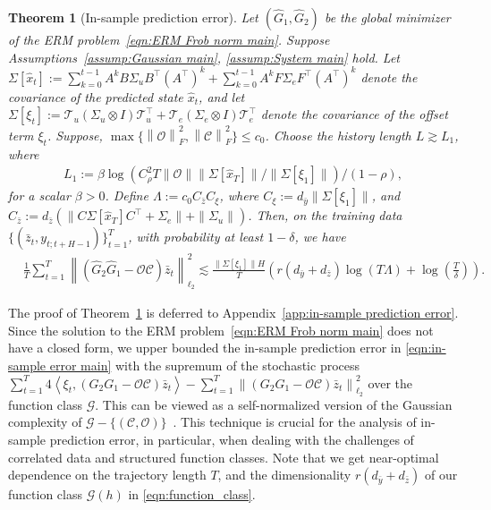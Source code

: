 \documentclass[11pt]{article}
\newtheorem{theorem}{Theorem}
\renewcommand{\cite}{\citep}
\newcommand{\ybar}{\bar{y}}
\newcommand{\zbar}{\bar{z}}
\newcommand{\xtil}{\hat{x}}
\newcommand{\Ccal}{\mathcal{C}}
\newcommand{\Gcal}{\mathcal{G}}
\newcommand{\Ocal}{\mathcal{O}}
\newcommand{\Tcal}{\mathcal{T}}
\newcommand{\tn}[1]{\left\|{#1}\right\|_{\ell_2}}
\newcommand{\tf}[1]{\left\|{#1}\right\|_{F}}
\newcommand{\norm}[1]{\|{#1} \|}
\newcommand{\T}{\top}
\newcommand{\li}{\left<}
\newcommand{\ri}{\right>}
\newcommand{\<}{\langle}
\renewcommand{\>}{\rangle}
\numberwithin{equation}{section}
\begin{document}
\begin{theorem}[In-sample prediction error]\label{thrm:function_estimation main}
     Let $(\hat{G}_1, \hat{G}_2)$ be the global minimizer of the ERM problem~\eqref{eqn:ERM Frob norm main}. 
     Suppose Assumptions~\ref{assump:Gaussian main},  \ref{assump:System main} hold. Let $\Sigma[\xtil_t] :=  \sum_{k=0}^{t-1} A^k B \Sigma_u B^\T (A^\T)^k + \sum_{k=0}^{t-1} A^k F \Sigma_e F^\T (A^\T)^k$ denote the covariance of the predicted state $\xtil_t$, and let $\Sigma[\xi_t]  := \Tcal_u(\Sigma_u \otimes I)\Tcal_u^\T + \Tcal_e(\Sigma_e \otimes I)\Tcal_e^\T$ denote the covariance of the offset term $\xi_t$. Suppose, $\max\{\tf{\Ocal}^2, \tf{\Ccal}^2\} \leq c_0$. Choose the history length $L \gtrsim L_1$, where
     \begin{align*}
         L_1 := \beta\log\left(C_\rho^2 T \norm{\Ocal}\norm{\Sigma[\xtil_T]}/\norm{\Sigma[\xi_1]}\right)/(1-\rho),
     \end{align*} 
     for a scalar $\beta >0$. Define $\Lambda := c_0 C_{\zbar} C_{\xi}$, where $C_{\xi}{:=}d_{\ybar}\norm{\Sigma[\xi_1]}$, and $C_{\zbar}{:=} d_{\zbar}(\norm{C\Sigma[\xtil_T]C^\T {+} \Sigma_e} {+} \norm{\Sigma_u}) $. Then, on the training data $\lbrace (\zbar_t, y_{t;t+H-1}) \rbrace_{t=1}^{T}$, with probability at least $1-\delta$, we have     
    \begin{align} %
        &\frac{1}{T}\sum_{t=1}^{T}\tn{\left(\hat{G}_2\hat{G}_1 - \Ocal \Ccal\right) \zbar_t}^2 \lesssim \frac{\norm{\Sigma[\xi_1]}H}{T}  \left( r \left(d_{\ybar} + d_{\zbar} \right)\log \left( T\Lambda \right) + \log \left(\frac{T}{\delta}\right) \right). \label{eqn:in-sample error main}
    \end{align}
\end{theorem}


The proof of Theorem~\ref{thrm:function_estimation main} is deferred to Appendix~\ref{app:in-sample prediction error}.
Since the solution to the ERM problem~\eqref{eqn:ERM Frob norm main} does not have a closed form, we upper bounded the in-sample prediction error in \eqref{eqn:in-sample error main} with the supremum of the stochastic process $\sum_{t=1}^{T} 4 \li  \xi_t, (G_2G_1 - \Ocal\Ccal) \zbar_t \ri - \sum_{t=1}^{T}\tn{ (G_2G_1 - \Ocal\Ccal)\zbar_t}^2$ over the function class $\Gcal$. This can be viewed as a self-normalized version of the Gaussian complexity of $\Gcal - \{(\Ccal,\Ocal)\}$~\cite{ziemann2022single}. This technique is crucial for the analysis of in-sample prediction error, in particular, when dealing with the challenges of correlated data and structured function classes.
 Note that we get near-optimal dependence on the trajectory length $T$, and the dimensionality $r (d_{\ybar} + d_{\zbar})$ of our function class $\Gcal(h)$ in \eqref{eqn:function_class}. 
\end{document}
